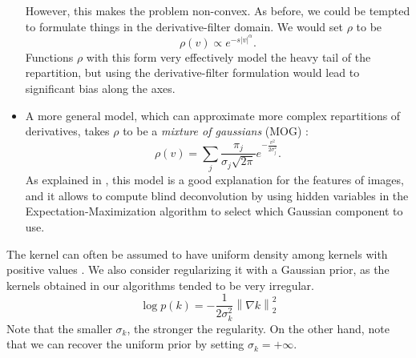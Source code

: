 \documentclass[english,a4paper]{article}
\theoremstyle{plain}
\theoremstyle{definition}
\theoremstyle{remark}
\newcommand{\norm}[1]{\left\lVert #1 \right\rVert}
\begin{document}
\begin{itemize}
	However, this makes the problem non-convex.
	As before, we could be tempted to formulate things in the derivative-filter domain. We would set $\rho$ to be
	\begin{equation}\label{eq:rho_hyper_laplacian}
	\rho(v) \propto e^{-s|v|^\alpha}.
	\end{equation}
	Functions $\rho$ with this form very effectively model the heavy tail of the repartition, but using the derivative-filter formulation would lead to significant bias along the axes.
	\item A more general model, which can approximate more complex repartitions of derivatives, takes $\rho$ to be a \emph{mixture of gaussians} (MOG) \cite{fergus2006removing,levin2011efficient}:
	\begin{equation}\label{eq:rho_MOG}
	\rho(v) = \sum_j \frac{\pi_j}{\sigma_j\sqrt{2\pi}} e^{-\frac{v^2}{2\sigma_j^2}} .
	\end{equation}
	As explained in \cite{levin2011efficient}, this model is a good explanation for the features of images, and it allows to compute blind deconvolution by using hidden variables in the Expectation-Maximization algorithm to select which Gaussian component to use.
\end{itemize}


The kernel can often be assumed to have uniform density among kernels with positive values \cite{levi2009using}.
We also consider regularizing it with a Gaussian prior, as the kernels obtained in our algorithms tended to be very irregular.
\begin{equation}\label{eq:p_k_gaussian}
\log p(k) = -\frac{1}{2\sigma_k^2}\norm{\nabla k}_2^2
\end{equation}
Note that the smaller $\sigma_k$, the stronger the regularity. On the other hand, note that we can recover the uniform prior by setting $\sigma_k = +\infty$.
\end{document}
